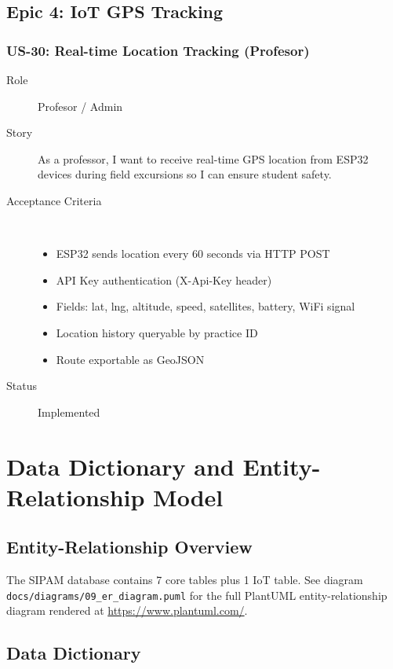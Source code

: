 \documentclass[12pt,a4paper]{report}
\begin{document}
\section{Epic 4: IoT GPS Tracking}

\subsection{US-30: Real-time Location Tracking (Profesor)}
\begin{description}
    \item[Role] Profesor / Admin
    \item[Story] As a professor, I want to receive real-time GPS location from ESP32 devices during field excursions so I can ensure student safety.
    \item[Acceptance Criteria] ~
    \begin{itemize}
        \item ESP32 sends location every 60 seconds via HTTP POST
        \item API Key authentication (X-Api-Key header)
        \item Fields: lat, lng, altitude, speed, satellites, battery, WiFi signal
        \item Location history queryable by practice ID
        \item Route exportable as GeoJSON
    \end{itemize}
    \item[Status] \textcolor{forestgreen}{\checkmark} Implemented
\end{description}

\chapter{Data Dictionary and Entity-Relationship Model}

\section{Entity-Relationship Overview}

The SIPAM database contains 7 core tables plus 1 IoT table. See diagram \texttt{docs/diagrams/09\_er\_diagram.puml} for the full PlantUML entity-relationship diagram rendered at \url{https://www.plantuml.com/}.

\section{Data Dictionary}
\end{document}
